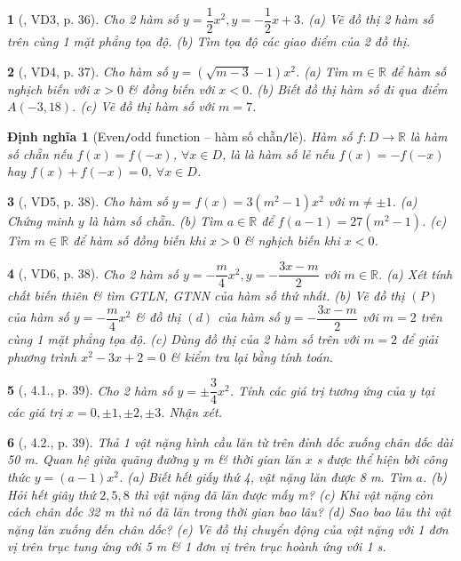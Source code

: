 \documentclass{article}
\newtheorem{baitoan}{}
\newtheorem{dinhnghia}{Định nghĩa}
\begin{document}
\begin{baitoan}[\cite{Binh_boi_duong_Toan_9_tap_2}, VD3, p. 36]
	Cho 2 hàm số $y = \dfrac{1}{2}x^2,y = -\dfrac{1}{2}x + 3$. (a) Vẽ đồ thị 2 hàm số trên cùng 1 mặt phẳng tọa độ. (b) Tìm tọa độ các giao điểm của 2 đồ thị.
\end{baitoan}

\begin{baitoan}[\cite{Binh_boi_duong_Toan_9_tap_2}, VD4, p. 37]
	Cho hàm số $y = (\sqrt{m - 3} - 1)x^2$. (a) Tìm $m\in\mathbb{R}$ để hàm số nghịch biến với $x > 0$ \& đồng biến với $x < 0$. (b) Biết đồ thị hàm số đi qua điểm $A(-3,18)$. (c) Vẽ đồ thị hàm số với $m = 7$.
\end{baitoan}

\begin{dinhnghia}[Even{\tt/}odd function -- hàm số chẵn{\tt/}lẻ]
	Hàm số $f:D\to\mathbb{R}$ là {\rm hàm số chẵn} nếu $f(x) = f(-x)$, $\forall x\in D$, là là {\rm hàm số lẻ} nếu $f(x) = -f(-x)$ hay $f(x) + f(-x) = 0$, $\forall x\in D$.
\end{dinhnghia}

\begin{baitoan}[\cite{Binh_boi_duong_Toan_9_tap_2}, VD5, p. 38]
	Cho hàm số $y = f(x) = 3(m^2 - 1)x^2$ với $m\ne\pm1$. (a) Chứng minh $y$ là hàm số chẵn. (b) Tìm $a\in\mathbb{R}$ để $f(a - 1) = 27(m^2 - 1)$. (c) Tìm $m\in\mathbb{R}$ để hàm số đồng biến khi $x > 0$ \& nghịch biến khi $x < 0$.
\end{baitoan}

\begin{baitoan}[\cite{Binh_boi_duong_Toan_9_tap_2}, VD6, p. 38]
	Cho 2 hàm số $y = -\dfrac{m}{4}x^2,y = -\dfrac{3x - m}{2}$ với $m\in\mathbb{R}$. (a) Xét tính chất biến thiên \& tìm {\rm GTLN, GTNN} của hàm số thứ nhất. (b) Vẽ đồ thị $(P)$ của hàm số $y = -\dfrac{m}{4}x^2$ \& đồ thị $(d)$ của hàm số $y = -\dfrac{3x - m}{2}$ với $m = 2$ trên cùng 1 mặt phẳng tọa độ. (c) Dùng đồ thị của 2 hàm số trên với $m = 2$ để giải phương trình $x^2 - 3x + 2 = 0$ \& kiểm tra lại bằng tính toán.
\end{baitoan}

\begin{baitoan}[\cite{Binh_boi_duong_Toan_9_tap_2}, 4.1., p. 39]
	Cho 2 hàm số $y = \pm\dfrac{3}{4}x^2$. Tính các giá trị tương ứng của $y$ tại các giá trị $x = 0,\pm1,\pm2,\pm3$. Nhận xét.
\end{baitoan}

\begin{baitoan}[\cite{Binh_boi_duong_Toan_9_tap_2}, 4.2., p. 39]
	Thả 1 vật nặng hình cầu lăn từ trên đỉnh dốc xuống chân dốc dài {\rm50 m}. Quan hệ giữa quãng đường $y$ {\rm m} \& thời gian lăn $x$ {\rm s} được thể hiện bởi công thức $y = (a - 1)x^2$. (a) Biết hết giấy thứ 4, vật nặng lăn được {\rm8 m}. Tìm $a$. (b) Hỏi hết giây thứ $2,5,8$ thì vật nặng đã lăn được mấy {\rm m}? (c) Khi vật nặng còn cách chân dốc {\rm32 m} thì nó đã lăn trong thời gian bao lâu? (d) Sao bao lâu thì vật nặng lăn xuống đến chân dốc? (e) Vẽ đồ thị chuyển động của vật nặng với 1 đơn vị trên trục tung ứng với {\rm5 m} \& 1 đơn vị trên trục hoành ứng với {\rm1 s}.
\end{baitoan}
\end{document}
